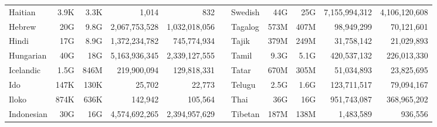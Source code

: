 \begin{table*}[t!]
\begin{tabular}{lrrrrclrrrr}
        Haitian                   & 3.9K                     & 3.3K                      & 1,014                    & 832                       &                          & Swedish                   & 44G                      & 25G                       & 7,155,994,312            & 4,106,120,608             \\
        Hebrew                    & 20G                      & 9.8G                      & 2,067,753,528            & 1,032,018,056             &                          & Tagalog                   & 573M                     & 407M                      & 98,949,299               & 70,121,601                \\
        Hindi                     & 17G                      & 8.9G                      & 1,372,234,782            & 745,774,934               &                          & Tajik                     & 379M                     & 249M                      & 31,758,142               & 21,029,893                \\
        Hungarian                 & 40G                      & 18G                       & 5,163,936,345            & 2,339,127,555             &                          & Tamil                     & 9.3G                     & 5.1G                      & 420,537,132              & 226,013,330               \\
        Icelandic                 & 1.5G                     & 846M                      & 219,900,094              & 129,818,331               &                          & Tatar                     & 670M                     & 305M                      & 51,034,893               & 23,825,695                \\
        Ido                       & 147K                     & 130K                      & 25,702                   & 22,773                    &                          & Telugu                    & 2.5G                     & 1.6G                      & 123,711,517              & 79,094,167                \\
        Iloko                     & 874K                     & 636K                      & 142,942                  & 105,564                   &                          & Thai                      & 36G                      & 16G                       & 951,743,087              & 368,965,202               \\
        Indonesian                & 30G                      & 16G                       & 4,574,692,265            & 2,394,957,629             &                          & Tibetan                   & 187M                     & 138M                      & 1,483,589                & 936,556                   \\

\end{tabular}
\end{table*}
